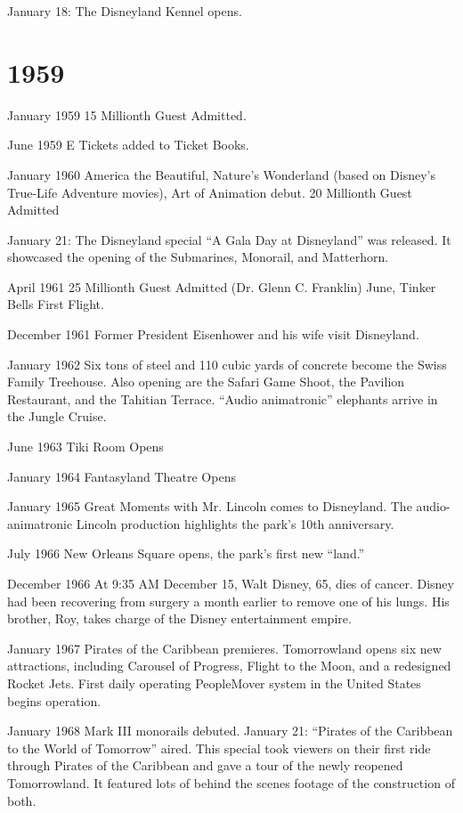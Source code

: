 January 18: The Disneyland Kennel opens.

\section{1959}
January 1959
15 Millionth Guest Admitted.

June 1959
E Tickets added to Ticket Books.

January 1960
America the Beautiful, Nature’s Wonderland (based on Disney’s True-Life Adventure movies), Art of Animation debut.
20 Millionth Guest Admitted

January 21: The Disneyland special “A Gala Day at Disneyland” was released. It showcased the opening of the Submarines, Monorail, and Matterhorn.

April 1961
25 Millionth Guest Admitted (Dr. Glenn C. Franklin) June, Tinker Bells First Flight.

December 1961
Former President Eisenhower and his wife visit Disneyland.

January 1962
Six tons of steel and 110 cubic yards of concrete become the Swiss Family Treehouse. Also opening are the Safari Game Shoot, the Pavilion Restaurant, and the Tahitian Terrace. “Audio animatronic” elephants arrive in the Jungle Cruise.

June 1963
Tiki Room Opens

January 1964
Fantasyland Theatre Opens

January 1965
Great Moments with Mr. Lincoln comes to Disneyland. The audio-animatronic Lincoln production highlights the park’s 10th anniversary.

July 1966
New Orleans Square opens, the park’s first new “land.”

December 1966
At 9:35 AM December 15, Walt Disney, 65, dies of cancer.  Disney had been recovering from surgery a month earlier to remove one of his lungs.  His brother, Roy, takes charge of the Disney entertainment empire.

January 1967
Pirates of the Caribbean premieres.  Tomorrowland opens six new attractions, including Carousel of Progress, Flight to the Moon, and a redesigned Rocket Jets.  First daily operating PeopleMover system in the United States begins operation.

January 1968
Mark III monorails debuted. January 21: “Pirates of the Caribbean to the World of Tomorrow” aired.  This special took viewers on their first ride through Pirates of the Caribbean and gave a tour of the newly reopened Tomorrowland.  It featured lots of behind the scenes footage of the construction of both.

